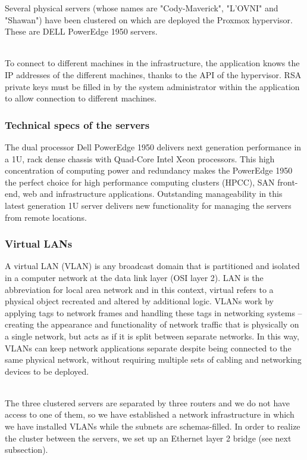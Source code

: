 \pagebreak

Several physical servers (whose names are "Cody-Maverick", "L'OVNI" and "Shawan") have been clustered on which are deployed the Proxmox hypervisor. These are DELL PowerEdge 1950 servers.

\\

To connect to different machines in the infrastructure, the application
knows the IP addresses of the different machines, thanks to the API of
the hypervisor. RSA private keys must be filled in by the system administrator within the application to allow connection to
different machines.

\vspace{1cm}
\subsubsection{Technical specs of the servers}

The dual processor Dell PowerEdge 1950 delivers next generation performance in a 1U, rack dense chassis with Quad-Core Intel Xeon processors. This high concentration of computing power and redundancy makes the PowerEdge 1950 the perfect choice for high performance computing clusters (HPCC), SAN front-end, web and infrastructure applications. Outstanding manageability in this latest generation 1U server delivers new functionality for managing the servers from remote locations.

\vspace{1cm}
\subsubsection{Virtual LANs}

A virtual LAN (VLAN) is any broadcast domain that is partitioned and isolated in a computer network at the data link layer (OSI layer 2). LAN is the abbreviation for local area network and in this context, virtual refers to a physical object recreated and altered by additional logic. VLANs work by applying tags to network frames and handling these tags in networking systems – creating the appearance and functionality of network traffic that is physically on a single network, but acts as if it is split between separate networks. In this way, VLANs can keep network applications separate despite being connected to the same physical network, without requiring multiple sets of cabling and networking devices to be deployed.

\\
\vspace{1cm}
The three clustered servers are separated by three routers and we do not have access to one of them, so we have established a network infrastructure in which we have installed VLANs while the subnets are schemas-filled. In order to realize the cluster between the servers, we set up an Ethernet layer 2 bridge (see next subsection).

